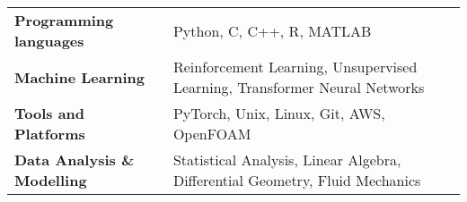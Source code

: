 \documentclass[letterpaper,11pt]{article}
\begin{document}
  \begin{multicols}{2}
    \begin{tabular}{ p{5.4cm} p{14.3cm}}
      \textbf{Programming languages}    & Python, C, C++, R, MATLAB \\
      \textbf{Machine Learning}         & Reinforcement Learning, Unsupervised Learning, Transformer Neural Networks \\
      \textbf{Tools and Platforms}         & PyTorch, Unix, Linux, Git, AWS, OpenFOAM \\
      \textbf{Data Analysis \& Modelling}         & Statistical Analysis, Linear Algebra, Differential Geometry, Fluid Mechanics \\
    \end{tabular}
  \end{multicols}

%
\printbibliography[title = PUBLICATIONS]
\vspace{-8pt}
\end{document}
